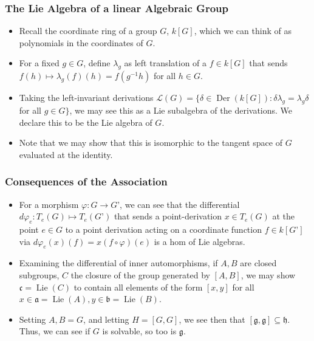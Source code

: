 \documentclass{beamer}
\theoremstyle{remark}
\begin{document}
\begin{frame}
\frametitle{The Lie Algebra of a linear Algebraic Group}
\begin{itemize}
\item Recall the coordinate ring of a group $G$, $k[G]$, which we can think of as polynomials in the coordinates of $G$.
\pause
\item For a fixed $g \in G$, define $\lambda_g$ as left translation of a $f \in k[G]$ that sends $f(h) \mapsto \lambda_g(f)(h) = f(g^{-1}h)$ for all $h \in G$.
\pause
\item Taking the left-invariant derivations $\mathcal{L}(G) = \{ \delta \in \operatorname{Der}(k[G]) : \delta \lambda_g = \lambda_g \delta $ for all $g \in G \}$, we may see this as a Lie subalgebra of the derivations. We declare this to be the Lie algebra of $G$. 
\pause
\item Note that we may show that this is isomorphic to the tangent space of $G$ evaluated at the identity.
\end{itemize}
\end{frame}

\begin{frame}
\frametitle{Consequences of the Association}
\begin{itemize}
\item For a morphism $\varphi: G \to G’$, we can see that the differential $d\varphi_e: T_e(G) \mapsto T_e(G’)$ that sends a point-derivation $x \in T_e(G)$ at the point $e \in G$ to a point derivation acting on a coordinate function $f \in k[G’]$ via $d\varphi_e(x)(f) = x(f \circ  \varphi)(e)$ is a hom of Lie algebras.
\pause
\item Examining the differential of inner automorphisms, if $A, B$ are closed subgroups, $C$ the closure of the group generated by $[A,B]$, we may show $\mathfrak{c} = \operatorname{Lie}(C)$ to contain all elements of the form $[x,y]$ for all $x \in \mathfrak{a} = \operatorname{Lie}(A), y \in \mathfrak{b} = \operatorname{Lie}(B)$.
\pause
\item Setting $A, B = G$, and letting $H = [G, G]$, we see then that $[\mathfrak{g}, \mathfrak{g} ] \subseteq \mathfrak{h}$. Thus, we can see if $G$ is solvable, so too is $\mathfrak{g}$.

\end{itemize}
\end{frame}
\end{document}
